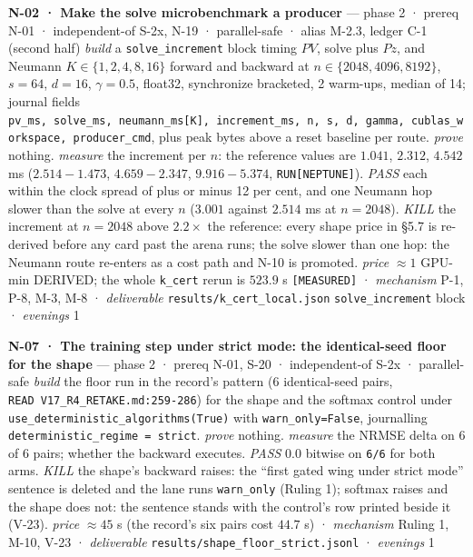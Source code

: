 \documentclass[11pt,a4paper]{article}
\theoremstyle{plain}
\theoremstyle{definition}
\theoremstyle{remark}
\begin{document}
\textbf{N-02 · Make the solve microbenchmark a producer} --- phase 2 ·
prereq N-01 · independent-of S-2x, N-19 · parallel-safe · alias M-2.3,
ledger C-1 (second half) \emph{build} a \texttt{solve\_increment} block
timing \(PV\), solve plus \(Pz\), and Neumann \(K\in\{1,2,4,8,16\}\)
forward and backward at \(n\in\{2048,4096,8192\}\), \(s=64\), \(d=16\),
\(\gamma=0.5\), float32, synchronize bracketed, 2 warm-ups, median of
14; journal fields
\texttt{pv\_ms,\ solve\_ms,\ neumann\_ms{[}K{]},\ increment\_ms,\ n,\ s,\ d,\ gamma,\ cublas\_workspace,\ producer\_cmd},
plus peak bytes above a reset baseline per route. \emph{prove} nothing.
\emph{measure} the increment per \(n\): the reference values are
\(1.041\), \(2.312\), \(4.542\) ms (\(2.514-1.473\), \(4.659-2.347\),
\(9.916-5.374\), \texttt{RUN{[}NEPTUNE{]}}). \emph{PASS} each within the
clock spread of plus or minus 12 per cent, and one Neumann hop slower
than the solve at every \(n\) (\(3.001\) against \(2.514\) ms at
\(n=2048\)). \emph{KILL} the increment at \(n=2048\) above \(2.2\times\)
the reference: every shape price in §5.7 is re-derived before any card
past the arena runs; the solve slower than one hop: the Neumann route
re-enters as a cost path and N-10 is promoted. \emph{price} \(\approx1\)
GPU-min DERIVED; the whole \texttt{k\_cert} rerun is \(523.9\) s
\texttt{{[}MEASURED{]}} · \emph{mechanism} P-1, P-8, M-3, M-8 ·
\emph{deliverable} \texttt{results/k\_cert\_local.json}
\texttt{solve\_increment} block · \emph{evenings} 1

\textbf{N-07 · The training step under strict mode: the identical-seed
floor for the shape} --- phase 2 · prereq N-01, S-20 · independent-of
S-2x · parallel-safe \emph{build} the floor run in the record's pattern
(6 identical-seed pairs, \texttt{READ\ V17\_R4\_RETAKE.md:259-286}) for
the shape and the softmax control under
\texttt{use\_deterministic\_algorithms(True)} with
\texttt{warn\_only=False}, journalling
\texttt{deterministic\_regime\ =\ strict}. \emph{prove} nothing.
\emph{measure} the NRMSE delta on 6 of 6 pairs; whether the backward
executes. \emph{PASS} \(0.0\) bitwise on \texttt{6/6} for both arms.
\emph{KILL} the shape's backward raises: the ``first gated wing under
strict mode'' sentence is deleted and the lane runs \texttt{warn\_only}
(Ruling 1); softmax raises and the shape does not: the sentence stands
with the control's row printed beside it (V-23). \emph{price}
\(\approx45\) s (the record's six pairs cost \(44.7\) s) ·
\emph{mechanism} Ruling 1, M-10, V-23 · \emph{deliverable}
\texttt{results/shape\_floor\_strict.jsonl} · \emph{evenings} 1
\end{document}
